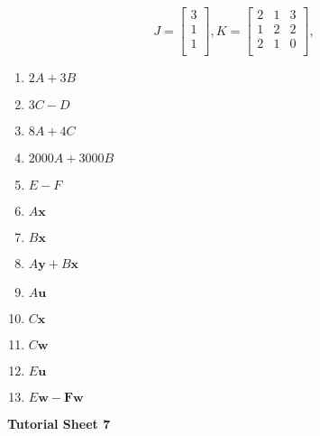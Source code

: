 \documentclass[11pt,a4paper,titlepage,oneside,openany]{article}
\numberwithin{equation}{section}
\numberwithin{algorithm}{section}
\numberwithin{figure}{section}
\numberwithin{table}{section}
\renewcommand{\vec}[1]{\mathbf{#1}}
\begin{document}
\begin{enumerate}
\begin{equation*}
  \end{equation*}
    \begin{equation*}
J=\left[ \begin{array}{c}
3\\
1\\
1\\ \end{array}\right],
K=\left[ \begin{array}{ccc}
2 & 1 & 3\\1 & 2 & 2\\2 & 1 & 0\\\end{array}\right], 
  \end{equation*}
  \begin{multicols}{3}
    \begin{enumerate}
    \item $2A+3B$
    \item $3C-D$
    \item $8A+4C$
    \item $2000A+3000B$
    \item $E-F$
    \item $A\vec{x}$
    \item $B\vec{x}$
    \item $A\vec{y}+B\vec{x}$
    \item $A\vec{u}$
    \item $C\vec{x}$
    \item $C\vec{w}$
    \item $E\vec{u}$
    \item $E\vec{w}-\vec{F}\vec{w}$

    \end{enumerate}
  \end{multicols}

\end{enumerate}
\pagebreak

\begin{center}
  \textbf{Tutorial Sheet 7}
\end{center}
\end{document}
